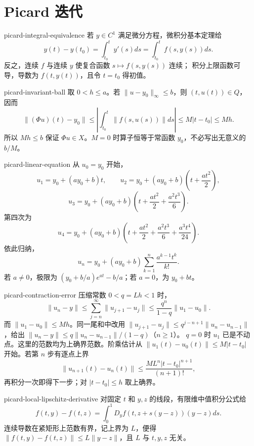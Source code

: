 \chapter{Picard 迭代}

\begin{solution}{picard-integral-equivalence}
若 \(y\in C^1\) 满足微分方程，微积分基本定理给
\[
 y(t)-y(t_0)=\int_{t_0}^{t}y'(s)ds
 =\int_{t_0}^{t}f(s,y(s))ds.
\]
反之，连续 \(f\) 与连续 \(y\) 使复合函数 \(s\mapsto f(s,y(s))\) 连续；
积分上限函数可导，导数为 \(f(t,y(t))\)，且令 \(t=t_0\) 得初值。
\end{solution}

\begin{solution}{picard-invariant-ball}
取 \(0<h\le a\)。若 \(\|u-y_0\|_\infty\le b\)，则 \((t,u(t))\in Q\)，因而
\[
 \|(\Phi u)(t)-y_0\|
 \le\left|\int_{t_0}^{t}\|f(s,u(s))\|ds\right|
 \le M|t-t_0|\le Mh.
\]
所以 \(Mh\le b\) 保证 \(\Phi u\in X\)。\(M=0\) 时算子恒等于常函数 \(y_0\)，不必写出无意义的 \(b/M\)。
\end{solution}

\begin{solution}{picard-linear-equation}
从 \(u_0=y_0\) 开始，
\[
 u_1=y_0+(ay_0+b)t,\qquad
 u_2=y_0+(ay_0+b)\left(t+\frac{at^2}{2}\right),
\]
\[
 u_3=y_0+(ay_0+b)\left(t+\frac{at^2}{2}+\frac{a^2t^3}{6}\right).
\]
第四次为
\[
 u_4=y_0+(ay_0+b)\left(t+\frac{at^2}{2}+\frac{a^2t^3}{6}
                       +\frac{a^3t^4}{24}\right).
\]
依此归纳，
\[
 u_n=y_0+(ay_0+b)\sum_{k=1}^n\frac{a^{k-1}t^k}{k!}.
\]
若 \(a\ne0\)，极限为
\((y_0+b/a)e^{at}-b/a\)；若 \(a=0\)，为 \(y_0+bt\)。
\end{solution}

\begin{solution}{picard-contraction-error}
压缩常数 \(0<q=Lh<1\) 时，
\[
 \|u_n-y\|\le\sum_{j=n}^\infty\|u_{j+1}-u_j\|
 \le\frac{q^n}{1-q}\|u_1-u_0\|.
\]
而 \(\|u_1-u_0\|\le Mh\)。同一尾和中改用
\(\|u_{j+1}-u_j\|\le q^{j-n+1}\|u_n-u_{n-1}\|\)，给出
\(\|u_n-y\|\le q\|u_n-u_{n-1}\|/(1-q)\)（\(n\ge1\)）。
\(q=0\) 时 \(u_1\) 已是不动点。这里的范数均为上确界范数。阶乘估计从
\(\|u_1(t)-u_0(t)\|\le M|t-t_0|\) 开始。若第 \(n\) 步有逐点上界
\[
 \|u_{n+1}(t)-u_n(t)\|
 \le\frac{ML^n|t-t_0|^{n+1}}{(n+1)!},
\]
再积分一次即得下一步；对 \(|t-t_0|\le h\) 取上确界。
\end{solution}

\begin{solution}{picard-local-lipschitz-derivative}
对固定 \(t\) 和 \(y,z\) 的线段，有限维中值积分公式给
\[
 f(t,y)-f(t,z)=\int_0^1D_yf(t,z+s(y-z))(y-z)ds.
\]
连续导数在紧矩形上范数有界，记上界为 \(L\)，便得
\(\|f(t,y)-f(t,z)\|\le L\|y-z\|\)，且 \(L\) 与 \(t,y,z\) 无关。
\end{solution}

